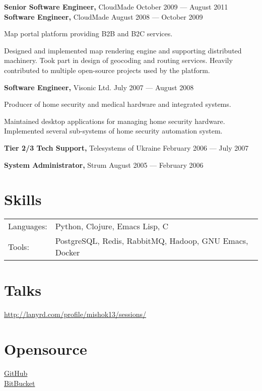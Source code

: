 \documentclass[margin]{res}
\begin{document}
\begin{resume}
{\bf Senior Software Engineer,} CloudMade \hfill October 2009 --- August 2011\\
{\bf Software Engineer,} CloudMade \hfill August 2008 --- October 2009

Map portal platform providing B2B and B2C services.

Designed and implemented map rendering engine and supporting
distributed machinery. Took part in design of geocoding and routing
services. Heavily contributed to multiple open-source projects used by
the platform.

{\bf Software Engineer,} Visonic Ltd. \hfill July 2007 --- August 2008

Producer of home security and medical hardware and integrated systems.

Maintained desktop applications for managing home security
hardware. Implemented several sub-systems of home security automation
system.

{\bf Tier 2/3 Tech Support,} Telesystems of Ukraine \hfill February 2006 --- July 2007

{\bf System Administrator,} Strum \hfill August 2005 --- February 2006

\section{Skills}
\begin{tabular}{l p{5in}}
  Languages: & Python, Clojure, Emacs Lisp, C \\
  Tools: & PostgreSQL, Redis, RabbitMQ, Hadoop, GNU Emacs, Docker \\
\end{tabular}

\section{Talks}

\href{http://lanyrd.com/profile/mishok13/sessions/}{http://lanyrd.com/profile/mishok13/sessions/}

\section{Opensource}

\href{https://github.com/mishok13}{GitHub}\\
\href{https://bitbucket.org/mishok13}{BitBucket}

\end{resume}
\end{document}
